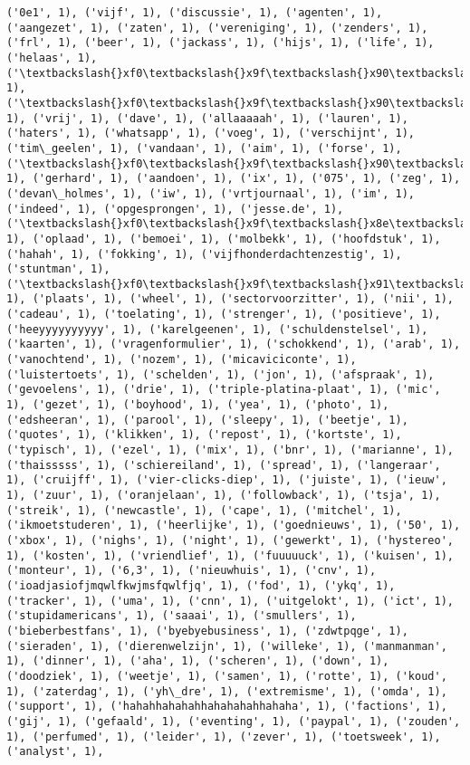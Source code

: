 \documentclass{article}
\begin{document}
\begin{Verbatim}[commandchars=\\\{\}]
('0e1', 1), ('vijf', 1), ('discussie', 1), ('agenten', 1), ('aangezet', 1), ('zaten', 1), ('vereniging', 1), ('zenders', 1), ('frl', 1), ('beer', 1), ('jackass', 1), ('hijs', 1), ('life', 1), ('helaas', 1), ('\textbackslash{}xf0\textbackslash{}x9f\textbackslash{}x90\textbackslash{}xb9', 1), ('\textbackslash{}xf0\textbackslash{}x9f\textbackslash{}x90\textbackslash{}xbe', 1), ('vrij', 1), ('dave', 1), ('allaaaaah', 1), ('lauren', 1), ('haters', 1), ('whatsapp', 1), ('voeg', 1), ('verschijnt', 1), ('tim\_geelen', 1), ('vandaan', 1), ('aim', 1), ('forse', 1), ('\textbackslash{}xf0\textbackslash{}x9f\textbackslash{}x90\textbackslash{}x86', 1), ('gerhard', 1), ('aandoen', 1), ('ix', 1), ('075', 1), ('zeg', 1), ('devan\_holmes', 1), ('iw', 1), ('vrtjournaal', 1), ('im', 1), ('indeed', 1), ('opgesprongen', 1), ('jesse.de', 1), ('\textbackslash{}xf0\textbackslash{}x9f\textbackslash{}x8e\textbackslash{}xb6', 1), ('oplaad', 1), ('bemoei', 1), ('molbekk', 1), ('hoofdstuk', 1), ('hahah', 1), ('fokking', 1), ('vijfhonderdachtenzestig', 1), ('stuntman', 1), ('\textbackslash{}xf0\textbackslash{}x9f\textbackslash{}x91\textbackslash{}x8b\textbackslash{}xf0\textbackslash{}x9f\textbackslash{}x92\textbackslash{}x83\textbackslash{}xf0\textbackslash{}x9f\textbackslash{}x92\textbackslash{}x81', 1), ('plaats', 1), ('wheel', 1), ('sectorvoorzitter', 1), ('nii', 1), ('cadeau', 1), ('toelating', 1), ('strenger', 1), ('positieve', 1), ('heeyyyyyyyyyy', 1), ('karelgeenen', 1), ('schuldenstelsel', 1), ('kaarten', 1), ('vragenformulier', 1), ('schokkend', 1), ('arab', 1), ('vanochtend', 1), ('nozem', 1), ('micaviciconte', 1), ('luistertoets', 1), ('schelden', 1), ('jon', 1), ('afspraak', 1), ('gevoelens', 1), ('drie', 1), ('triple-platina-plaat', 1), ('mic', 1), ('gezet', 1), ('boyhood', 1), ('yea', 1), ('photo', 1), ('edsheeran', 1), ('parool', 1), ('sleepy', 1), ('beetje', 1), ('quotes', 1), ('klikken', 1), ('repost', 1), ('kortste', 1), ('typisch', 1), ('ezel', 1), ('mix', 1), ('bnr', 1), ('marianne', 1), ('thaisssss', 1), ('schiereiland', 1), ('spread', 1), ('langeraar', 1), ('cruijff', 1), ('vier-clicks-diep', 1), ('juiste', 1), ('ieuw', 1), ('zuur', 1), ('oranjelaan', 1), ('followback', 1), ('tsja', 1), ('streik', 1), ('newcastle', 1), ('cape', 1), ('mitchel', 1), ('ikmoetstuderen', 1), ('heerlijke', 1), ('goednieuws', 1), ('50', 1), ('xbox', 1), ('nighs', 1), ('night', 1), ('gewerkt', 1), ('hystereo', 1), ('kosten', 1), ('vriendlief', 1), ('fuuuuuck', 1), ('kuisen', 1), ('monteur', 1), ('6,3', 1), ('nieuwhuis', 1), ('cnv', 1), ('ioadjasiofjmqwlfkwjmsfqwlfjq', 1), ('fod', 1), ('ykq', 1), ('tracker', 1), ('uma', 1), ('cnn', 1), ('uitgelokt', 1), ('ict', 1), ('stupidamericans', 1), ('saaai', 1), ('smullers', 1), ('bieberbestfans', 1), ('byebyebusiness', 1), ('zdwtpqge', 1), ('sieraden', 1), ('dierenwelzijn', 1), ('willeke', 1), ('manmanman', 1), ('dinner', 1), ('aha', 1), ('scheren', 1), ('down', 1), ('doodziek', 1), ('weetje', 1), ('samen', 1), ('rotte', 1), ('koud', 1), ('zaterdag', 1), ('yh\_dre', 1), ('extremisme', 1), ('omda', 1), ('support', 1), ('hahahhahahahhahahahahhahaha', 1), ('factions', 1), ('gij', 1), ('gefaald', 1), ('eventing', 1), ('paypal', 1), ('zouden', 1), ('perfumed', 1), ('leider', 1), ('zever', 1), ('toetsweek', 1), ('analyst', 1), 
\end{Verbatim}
\end{document}
